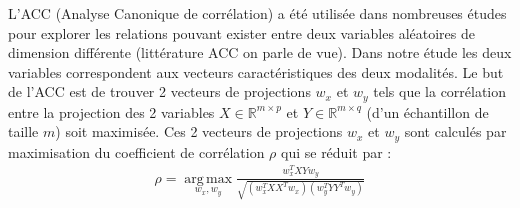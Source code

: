 L'ACC (Analyse Canonique de corrélation) a été utilisée dans nombreuses études pour explorer les relations pouvant exister entre deux variables aléatoires de dimension différente (littérature ACC on parle de vue). Dans notre étude les deux variables correspondent aux vecteurs caractéristiques des deux modalités. Le but de l'ACC est de trouver 2 vecteurs de projections $w_{x}$ et $w_{y}$ tels que la corrélation entre la projection des 2 variables $ X \in \mathbb{R}^{m\times p}$ et $Y \in \mathbb{R}^{m\times q}$ (d'un échantillon de taille $m$) soit maximisée. Ces 2 vecteurs de projections $w_{x}$ et $w_{y}$ sont calculés par maximisation du coefficient de corrélation $\rho$ qui se réduit par :\\
\begin{eqnarray}
\rho = \operatorname*{arg\,max}_{w_{x},w_{y}} \frac{w^{T}_{x}XY w_{y}}{\sqrt{(w^{T}_{x}XX^{T}w_{x}) (w^{T}_{y}YY^{T}w_{y})}}
\end{eqnarray}	

